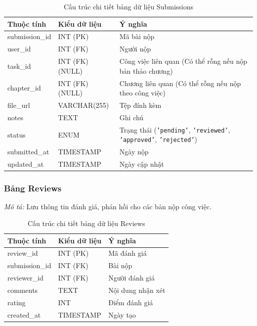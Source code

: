 \noindent
\begin{table}[H]
\centering
\renewcommand{\arraystretch}{1.3}
\begin{tabularx}{\textwidth}{|p{4cm}|p{3cm}|>{\raggedright\arraybackslash}X|}
\hline
\rowcolor{tableheader}
\textbf{Thuộc tính} & \textbf{Kiểu dữ liệu} & \textbf{Ý nghĩa} \\ \hline
submission\_id & INT (PK) & Mã bài nộp \\ \hline
user\_id & INT (FK) & Người nộp \\ \hline
task\_id & INT (FK) (NULL) & Công việc liên quan (Có thể rỗng nếu nộp bản thảo chương) \\ \hline
chapter\_id & INT (FK) (NULL) & Chương liên quan (Có thể rỗng nếu nộp theo công việc) \\ \hline
file\_url & VARCHAR(255) & Tệp đính kèm \\ \hline
notes & TEXT & Ghi chú \\ \hline
status & ENUM & Trạng thái (\texttt{'pending'}, \texttt{'reviewed'}, \texttt{'approved'}, \texttt{'rejected'}) \\ \hline
submitted\_at & TIMESTAMP & Ngày nộp \\ \hline
updated\_at & TIMESTAMP & Ngày cập nhật \\ \hline
\end{tabularx}
\caption{Cấu trúc chi tiết bảng dữ liệu Submissions}
\label{tab:db_submissions}
\end{table}
\vspace{0.5cm}

\subsubsection{Bảng Reviews}
\label{subsubsec:tbl_reviews}
\textit{Mô tả:} Lưu thông tin đánh giá, phản hồi cho các bản nộp công việc.

\noindent
\begin{table}[H]
\centering
\renewcommand{\arraystretch}{1.3}
\begin{tabularx}{\textwidth}{|p{4cm}|p{3cm}|>{\raggedright\arraybackslash}X|}
\hline
\rowcolor{tableheader}
\textbf{Thuộc tính} & \textbf{Kiểu dữ liệu} & \textbf{Ý nghĩa} \\ \hline
review\_id & INT (PK) & Mã đánh giá \\ \hline
submission\_id & INT (FK) & Bài nộp \\ \hline
reviewer\_id & INT (FK) & Người đánh giá \\ \hline
comments & TEXT & Nội dung nhận xét \\ \hline
rating & INT & Điểm đánh giá \\ \hline
created\_at & TIMESTAMP & Ngày tạo \\ \hline
\end{tabularx}
\caption{Cấu trúc chi tiết bảng dữ liệu Reviews}
\label{tab:db_reviews}
\end{table}
\vspace{0.5cm}

